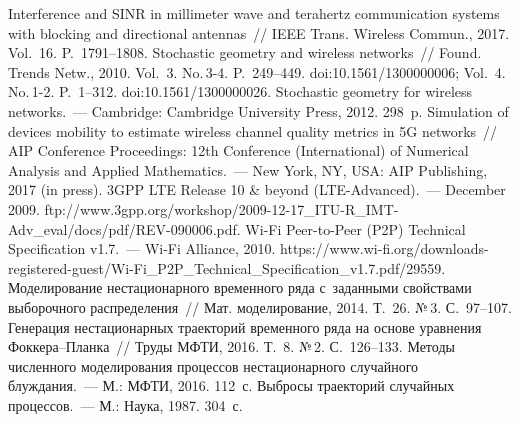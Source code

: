 \begin{multicols}{2}
{{\begin{thebibliography}{99}
  Interference and SINR in millimeter
wave and terahertz communication systems with 
blocking and directional antennas~//
{IEEE Trans. Wireless Commun.}, 2017.
Vol.~16. P.~1791--1808. %
 Stochastic geometry and wireless networks~// Found. 
Trends Netw., 2010. Vol.~3. No.\,3-4. P.~249--449. 
doi:10.1561/1300000006; Vol.~4. No.\,1-2. P.~1--312. doi:10.1561/1300000026.
 Stochastic geometry for wireless networks.~--- Cambridge: Cambridge University 
Press, 2012. 298~p.
Simulation of devices mobility to estimate wireless channel quality metrics in 5G networks~// AIP 
Conference Proceedings: 12th Conference (International) of Numerical Analysis and Applied 
Mathematics.~--- New York, NY, USA: AIP Publishing, 
2017 (in press).
3GPP LTE Release 10 \& beyond (LTE-Advanced).~--- December 2009. {\sf 
ftp://www.3gpp.org/workshop/2009-12-17\_ITU-R\_IMT-Adv\_eval/docs/pdf/REV-090006.pdf}.
Wi-Fi Peer-to-Peer (P2P) Technical Specification v1.7.~--- Wi-Fi Alliance, 2010. {\sf 
https://www.wi-fi.\linebreak org/downloads-registered-guest/Wi-Fi\_P2P\_Technical\_\linebreak Specification\_v1.7.pdf/29559}.
 Моделирование нестационарного 
временного ряда с~заданными свойствами выборочного распределения~// Мат. 
моделирование, 2014. Т.~26. №\,3. С.~97--107.
 Генерация нестационарных траекторий временного ряда 
на основе уравнения Фок\-ке\-ра--План\-ка~// Труды МФТИ, 2016. Т.~8. №\,2. С.~126--133.
 Методы численного моделирования процессов 
нестационарного случайного блуждания.~--- М.: МФТИ, 2016. 112~с.
 Выбросы траекторий случайных процессов.~--- М.: 
Наука, 1987. 304~с.

 \end{thebibliography}

 }
 }

\end{multicols}

